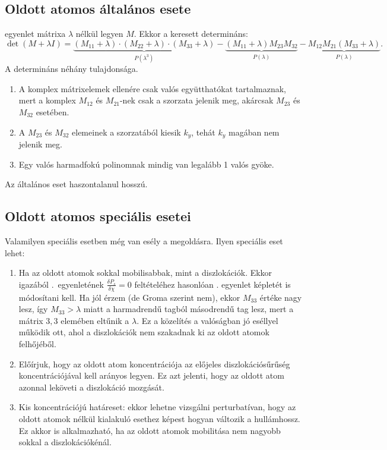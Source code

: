 \documentclass[10pt,a4paper]{scrartcl}
\begin{document}
\subsection{Oldott atomos általános esete}
 egyenlet mátrixa $\lambda$ nélkül legyen $M$. Ekkor a keresett determináns:
\[\det \left( {M + \lambda I} \right) = \underbrace {\left( {{M_{11}} + \lambda } \right) \cdot \left( {{M_{22}} + \lambda } \right) \cdot \left( {{M_{33}} + \lambda } \right)}_{P\left( {{\lambda ^3}} \right)} - \underbrace {\left( {{M_{11}} + \lambda } \right){M_{23}}{M_{32}}}_{P\left( \lambda  \right)} - \underbrace {{M_{12}}{M_{21}}\left( {{M_{33}} + \lambda } \right)}_{P\left( \lambda  \right)}.\]
A determináns néhány tulajdonsága.
\begin{enumerate}
\item A komplex mátrixelemek ellenére csak valós együtthatókat tartalmaznak, mert a komplex $M_{12}$ és $M_{21}$-nek csak a szorzata jelenik meg, akárcsak $M_{23}$ és $M_{32}$ esetében.
\item A $M_{23}$ és $M_{32}$ elemeinek a szorzatából kiesik $k_y$, tehát $k_y$ magában nem jelenik meg.
\item Egy valós harmadfokú polinomnak mindig van legalább 1 valós gyöke.
\end{enumerate}
Az általános eset haszontalanul hosszú.

\subsection{Oldott atomos speciális esetei}
Valamilyen speciális esetben még van esély a megoldásra. Ilyen speciális eset lehet:

\begin{enumerate}
\item Ha az oldott atomok sokkal mobilisabbak, mint a diszlokációk. Ekkor igazából .\ egyenletének $\frac{{\delta {P_s}}}{{\delta \chi }} = 0$ feltételéhez hasonlóan . egyenlet képletét is módosítani kell. Ha jól érzem (de Groma szerint nem), ekkor $M_{33}$ értéke nagy lesz, így $M_{33} > \lambda$ miatt a harmadrendű tagból másodrendű tag lesz, mert a mátrix $3,3$ elemében eltűnik a $\lambda$. Ez a közelítés a valóságban jó eséllyel működik ott, ahol a diszlokációk nem szakadnak ki az oldott atomok felhőjéből.

\item Előírjuk, hogy az oldott atom koncentrációja az előjeles diszlokációsűrűség koncentrációjával kell arányos legyen. Ez azt jelenti, hogy az oldott atom azonnal leköveti a diszlokáció mozgását.

\item Kis koncentrációjú határeset: ekkor lehetne vizsgálni perturbatívan, hogy az oldott atomok nélkül kialakuló esethez képest hogyan változik a hullámhossz. Ez akkor is alkalmazható, ha az oldott atomok mobilitása nem nagyobb sokkal a diszlokációkénál.
\end{enumerate}
\end{document}
